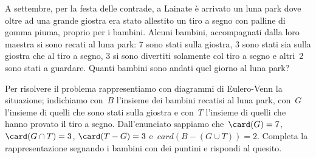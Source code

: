 {\begin{esempio}
 \end{esempio}

 \begin{esempio}
 A settembre, per la festa delle contrade, a Lainate è arrivato un luna
park dove oltre ad una grande giostra era stato allestito un tiro a
segno con palline di gomma piuma, proprio per i bambini. Alcuni
bambini, accompagnati dalla loro maestra si sono recati al luna park: 7
sono stati sulla giostra, 3 sono stati sia sulla giostra che al tiro a
segno, 3 si sono divertiti solamente col tiro a segno e altri~2 sono
stati a guardare. Quanti bambini sono andati quel giorno al luna park?

\begin{minipage}{.59 \textwidth}
Per risolvere il problema rappresentiamo con diagrammi di Eulero-Venn la 
situazione; indichiamo con~\(B\) l'insieme dei bambini recatisi al luna 
park, 
con~\(G\) l'insieme di quelli che sono stati sulla giostra e con~\(T\) 
l'insieme
di quelli che hanno provato il tiro a segno.
Dall'enunciato sappiamo 
che~\(\card(G)=7\), \(\card(G\cap T)=3\), \(\card(T-G)=3\) 
e~\(card(B-(G\cup T))=2\).
Completa la rappresentazione segnando i bambini con dei puntini e rispondi 
al quesito.
\end{minipage}
\hfill
\begin{minipage}{.39 \textwidth}
\begin{center}
 
\end{center}
\end{minipage}

\end{esempio}

\begin{comment}
 
\begin{esempio}
Alla palestra Anni Verdi, il giovedì, si tengono due allenamenti di 
pallavolo 
e calcio dalle~17.00 alle~18.30. Frequentano il corso di
pallavolo~15 persone e sono~28 quelli che frequentano l'allenamento di 
calcio. 
Quante persone frequentano pallavolo o calcio in questo orario?

\emph{Dati} \(P=\{\text{iscritti a pallavolo}\}\), \(C=\{\text{iscritti a 
calcio}\}\), \(\card(P)=15\), \(\card(C)=28\).

\emph{Obiettivo} Il problema chiede di determinare la cardinalità 
di~\(P\cup C\).

\emph{Soluzione} Osserviamo che non ci sono persone che frequentano sia
l'uno che l'altro sport essendo gli allenamenti nello stesso orario; gli 
insiemi~\(P\) e~\(C\) sono disgiunti:~\(P\cap C=\emptyset \). 
Quindi:~\(\card(P\cup C)=\card(P)+\card(C)=15+28=43\).
\end{esempio}


\end{comment}}
